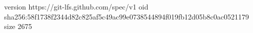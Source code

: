 version https://git-lfs.github.com/spec/v1
oid sha256:58f1738f2344d82c825af5c49ac99e0738544894f019fb12d05b8c0ac0521179
size 2675
